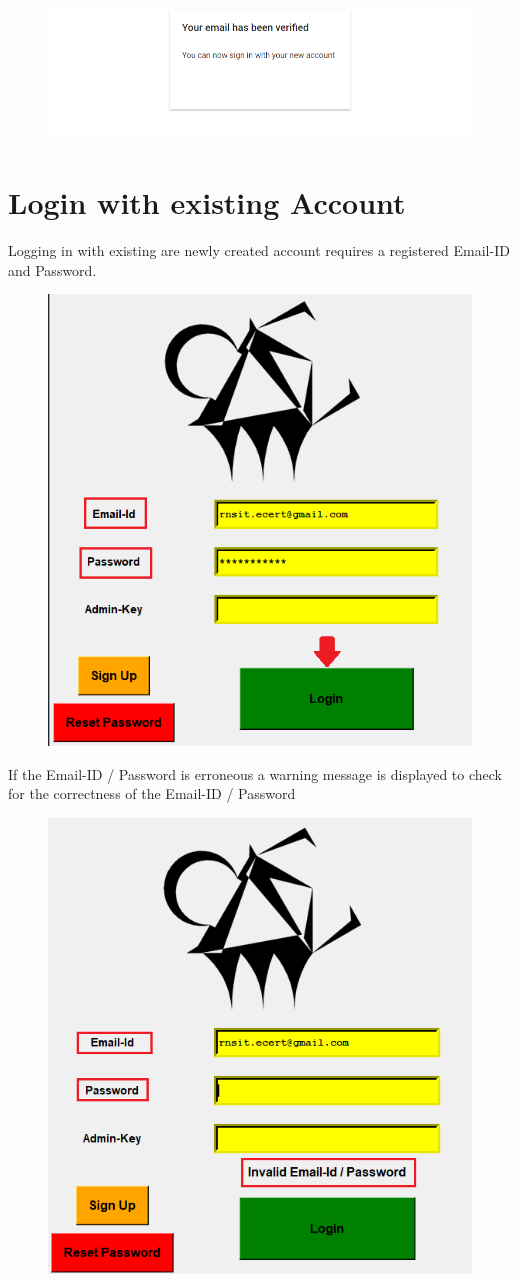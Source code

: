 \begin{figure}[H]
	\centering
	\includegraphics[width=0.95\linewidth]{images/login_page/login_5}
	\label{fig:login5}
\end{figure}

\section{Login with existing Account}

Logging in with existing are newly created account requires a registered Email-ID and Password. 


\begin{figure}[H]
	\centering
	\includegraphics[width=0.45\linewidth]{images/login_page/login_2}
	\label{fig:login2}
\end{figure}

If the Email-ID / Password is erroneous a warning message is displayed to check for the correctness of the Email-ID / Password

\begin{figure}[H]
	\centering
	\includegraphics[width=0.45\linewidth]{images/login_page/login_3}
	\label{fig:login3}
\end{figure}

